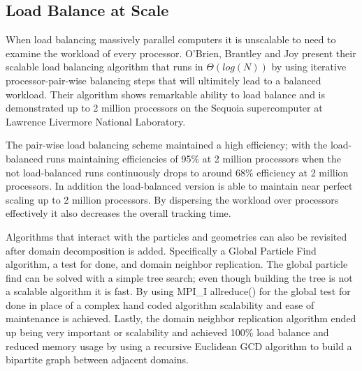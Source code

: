 \subsection*{Load Balance at Scale}

%
When load balancing massively parallel computers it is unscalable to need to examine the workload of every processor.
%
O'Brien, Brantley and Joy present their scalable load balancing algorithm that runs in $\Theta ( log ( N ) )$ by using iterative processor-pair-wise balancing steps that will ultimitely lead to a balanced workload.
%
Their algorithm shows remarkable ability to load balance and is demonstrated up to 2 million processors on the Sequoia supercomputer at Lawrence Livermore National Laboratory.
~\cite{o2013scalable}
%

%
The pair-wise load balancing scheme maintained a high efficiency; with the load-balanced runs maintaining efficiencies of 95\% at 2 million processors
when the not load-balanced runs continuously drops to around 68\% efficiency at 2 million processors.
%
In addition the load-balanced version is able to maintain near perfect scaling up to 2 million processors.
%
By dispersing the workload over processors effectively it also decreases the overall tracking time.
~\cite{o2013scalable}
%

Algorithms that interact with the particles and geometries can also be revisited after domain decomposition is added.
%
Specifically a Global Particle Find algorithm, a test for done, and domain neighbor replication.
%
The global particle find can be solved with a simple tree search; even though building the tree is not a scalable algorithm it is fast.
%
By using MPI\_I allreduce() for the global test for done in place of a complex hand coded algorithm scalability and ease of maintenance is achieved.
%
Lastly, the domain neighbor replication algorithm ended up being very important or scalability and achieved 100\% load balance and reduced memory usage by using a recursive Euclidean GCD algorithm to build a bipartite graph between adjacent domains. ~\cite{o2015particle}
%


